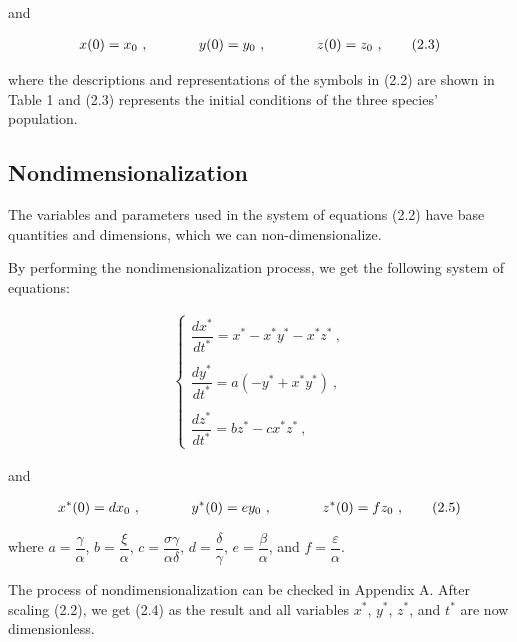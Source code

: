 \documentclass{article}
\begin{document}
\noindent and 

\begin{align*}
    x(0) = x_0 \ , \hspace{0.5in} y(0) = y_0 \ , \hspace{0.5in} z(0) = z_0 \ ,  \tag{2.3}
\end{align*}

\noindent where the descriptions and representations of the symbols in (2.2) are shown in Table 1 and (2.3) represents the initial conditions of the three species' population. 

\subsection{Nondimensionalization} %
The variables and parameters used in the system of equations (2.2) have base quantities and dimensions, which we can non-dimensionalize. 

\vspace{5mm}

\noindent By performing the nondimensionalization process, we get the following system of equations:

\begin{align*}
    \begin{cases}
        \dfrac{dx^*}{dt^*} = x^* - x^*y^* - x^*z^* \ , \\
        \\
        \dfrac{dy^*}{dt^*} = a(-y^* + x^*y^*) \ , \\
        \\
        \dfrac{dz^*}{dt^*} = bz^* - cx^*z^* \ ,
    \end{cases} \tag{2.4} 
\end{align*}

\noindent and 

\begin{align*}
    x^*(0) = dx_0 \ , \hspace{0.5in} y^*(0) = ey_0 \ , \hspace{0.5in} z^*(0) = fz_0 \ , \tag{2.5}
\end{align*}

\noindent where $a = \dfrac{\gamma}{\alpha}$, $b = \dfrac{\xi}{\alpha}$, $c = \dfrac{\sigma \gamma}{\alpha\delta}$, $d = \dfrac{\delta}{\gamma}$, $e = \dfrac{\beta}{\alpha}$, and $f = \dfrac{\varepsilon}{\alpha}$. 

\vspace{5mm}

\noindent The process of nondimensionalization can be checked in Appendix A. After scaling (2.2), we get (2.4) as the result and all variables $x^*$, $y^*$, $z^*$, and $t^*$ are now dimensionless.
\end{document}
